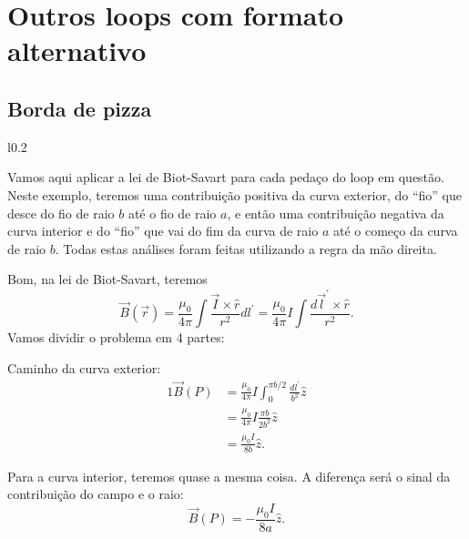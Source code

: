\documentclass{article}
\newcommand{\rcaligrafico}{r}
\begin{document}
\section{Outros loops com formato alternativo}
\subsection{Borda de pizza}
\begin{wrapfigure}[8]{l}{0.2\textwidth}
\end{wrapfigure}
Vamos aqui aplicar a lei de Biot-Savart para cada pedaço do loop em questão. Neste exemplo, teremos uma contribuição positiva da curva exterior, do ``fio'' que desce
do fio de raio $b$ até o fio de raio $a$, e então uma contribuição negativa da curva interior e do ``fio'' que vai do fim da curva de raio $a$ até o começo da curva
de raio $b$. Todas estas análises foram feitas utilizando a regra da mão direita.

Bom, na lei de Biot-Savart, teremos
\begin{equation}
 \vec{B}(\vec{r}) = \frac{\mu_0}{4\pi} \int \frac{\vec{I} \times \hat{\rcaligrafico}}{\rcaligrafico^2} dl^{\prime} = \frac{\mu_0}{4\pi} I \int \frac{d\vec{l}^{\prime}
 \times \hat{\rcaligrafico}}{\rcaligrafico^2}.
\end{equation}
Vamos dividir o problema em 4 partes:

Caminho da curva exterior:
\begin{alignat}{1}
 \vec{B}(P) &= \frac{\mu_0}{4\pi} I \int_{0}^{\pi b\slash 2} \frac{dl^{\prime}}{b^2}\hat{z}\\
 &= \frac{\mu_0}{4\pi} I \frac{\pi b}{2b^2}\hat{z}\\
 &= \frac{\mu_0 I}{8 b}\hat{z}.
\end{alignat}

Para a curva interior, teremos quase a mesma coisa. A diferença será o sinal da contribuição do campo e o raio:
\begin{equation}
 \vec{B}(P) = - \frac{\mu_0 I}{8 a}\hat{z}.
\end{equation}
\end{document}
